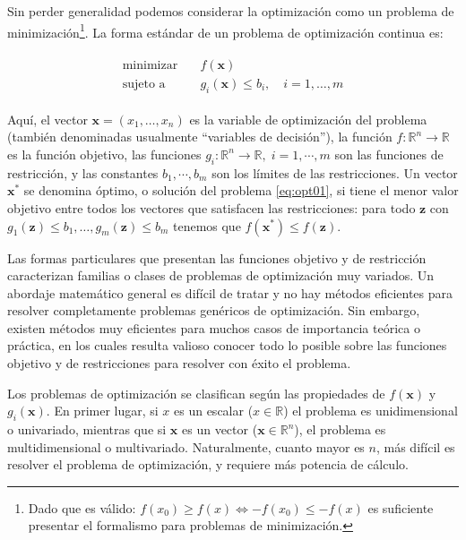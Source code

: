 Sin perder generalidad podemos considerar la optimización como un problema de minimización\footnote{Dado que es válido: $f(x_0) \geq f(x) \Leftrightarrow -f(x_0) \leq -f(x)$ es suficiente presentar el formalismo para problemas de minimización.}. La forma estándar de un problema de optimización continua es: 

\begin{align}
 \begin{split}
 \text{minimizar}& \quad f(\bm{x}) \\
 \text{sujeto a}& \quad g_i(\bm{x}) \leq b_i, \quad i = 1, \ldots, m
 \end{split}
 \label{eq:opt01}
\end{align}

Aquí, el vector $\bm{x} = (x_1, \ldots, x_n)$ es la variable de optimización del problema (también denominadas usualmente ``variables de decisión''), la función $f: \mathbb{R}^n \rightarrow \mathbb{R}$ es la función objetivo, las funciones $g_i: \mathbb{R}^n \rightarrow \mathbb{R}, \; i = 1, \cdots, m$ son las funciones de restricción, y las constantes $b_1, \cdots, b_m$ son los límites de las restricciones. Un vector $\bm{x}^*$ se denomina óptimo, o solución del problema \eqref{eq:opt01}, si tiene el menor valor objetivo entre todos los vectores que satisfacen las restricciones: para todo $\bm{z}$ con $g_1(\bm{z}) \leq b_1, \ldots, g_m(\bm{z}) \leq b_m$ tenemos que $f(\bm{x}^*) \leq f(\bm{z})$. 

Las formas particulares que presentan las funciones objetivo y de restricción caracterizan familias o clases de problemas de optimización muy variados. Un abordaje matemático general es difícil de tratar y no hay métodos eficientes para resolver completamente problemas genéricos de optimización. Sin embargo, existen métodos muy eficientes para muchos casos de importancia teórica o práctica, en los cuales resulta valioso conocer todo lo posible sobre las funciones objetivo y de restricciones para resolver con éxito el problema.

Los problemas de optimización se clasifican según las propiedades de $f(\bm{x})$ y $g_i(\bm{x})$. En primer lugar, si $x$ es un escalar ($x \in \mathbb{R}$) el problema es unidimensional o univariado, mientras que si $\bm{x}$ es un vector ($\bm{x} \in \mathbb{R}^n$), el problema es multidimensional o multivariado. Naturalmente, cuanto mayor es $n$, más difícil es resolver el problema de optimización, y requiere más potencia de cálculo.

